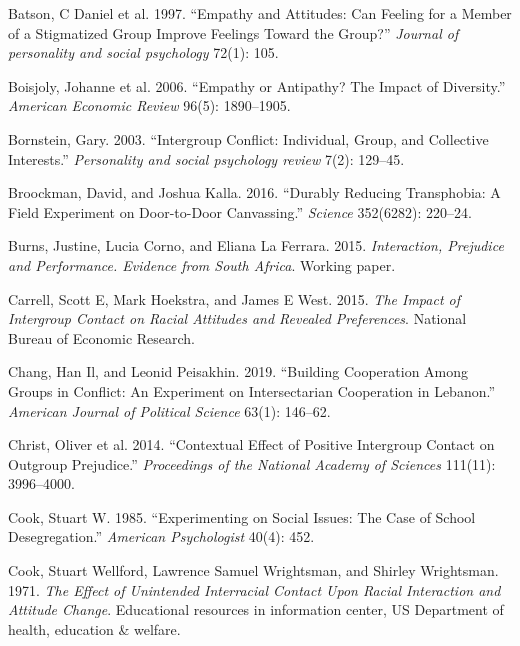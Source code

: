 \documentclass[11pt]{article}
\begin{document}
\begin{cslreferences}
\leavevmode\hypertarget{ref-batson1997empathy}{}%
Batson, C Daniel et al. 1997. ``Empathy and Attitudes: Can Feeling for a
Member of a Stigmatized Group Improve Feelings Toward the Group?''
\emph{Journal of personality and social psychology} 72(1): 105.

\leavevmode\hypertarget{ref-boisjoly2006empathy}{}%
Boisjoly, Johanne et al. 2006. ``Empathy or Antipathy? The Impact of
Diversity.'' \emph{American Economic Review} 96(5): 1890--1905.

\leavevmode\hypertarget{ref-bornstein2003intergroup}{}%
Bornstein, Gary. 2003. ``Intergroup Conflict: Individual, Group, and
Collective Interests.'' \emph{Personality and social psychology review}
7(2): 129--45.

\leavevmode\hypertarget{ref-broockman2016durably}{}%
Broockman, David, and Joshua Kalla. 2016. ``Durably Reducing
Transphobia: A Field Experiment on Door-to-Door Canvassing.''
\emph{Science} 352(6282): 220--24.

\leavevmode\hypertarget{ref-burns2015interaction}{}%
Burns, Justine, Lucia Corno, and Eliana La Ferrara. 2015.
\emph{Interaction, Prejudice and Performance. Evidence from South
Africa}. Working paper.

\leavevmode\hypertarget{ref-carrell2015impact}{}%
Carrell, Scott E, Mark Hoekstra, and James E West. 2015. \emph{The
Impact of Intergroup Contact on Racial Attitudes and Revealed
Preferences}. National Bureau of Economic Research.

\leavevmode\hypertarget{ref-chang2019building}{}%
Chang, Han Il, and Leonid Peisakhin. 2019. ``Building Cooperation Among
Groups in Conflict: An Experiment on Intersectarian Cooperation in
Lebanon.'' \emph{American Journal of Political Science} 63(1): 146--62.

\leavevmode\hypertarget{ref-christ2014contextual}{}%
Christ, Oliver et al. 2014. ``Contextual Effect of Positive Intergroup
Contact on Outgroup Prejudice.'' \emph{Proceedings of the National
Academy of Sciences} 111(11): 3996--4000.

\leavevmode\hypertarget{ref-cook1985experimenting}{}%
Cook, Stuart W. 1985. ``Experimenting on Social Issues: The Case of
School Desegregation.'' \emph{American Psychologist} 40(4): 452.

\leavevmode\hypertarget{ref-cook1971race}{}%
Cook, Stuart Wellford, Lawrence Samuel Wrightsman, and Shirley
Wrightsman. 1971. \emph{The Effect of Unintended Interracial Contact
Upon Racial Interaction and Attitude Change}. Educational resources in
information center, US Department of health, education \& welfare.


\end{cslreferences}
\end{document}
